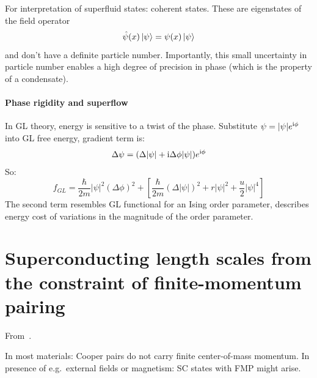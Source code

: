 \documentclass[../notes.tex]{subfiles}
\begin{document}
For interpretation of superfluid states: coherent states.
These are eigenstates of the field operator
\begin{equation}
	\hat{\psi}(x) \ket{\psi} = \psi (x) \ket{\psi} 
\end{equation}
and don't have a definite particle number.
Importantly, this small uncertainty in particle number enables a high degree of precision in phase (which is the property of a condensate).


\paragraph{Phase rigidity and superflow}

In GL theory, energy is sensitive to a twist of the phase.
Substitute \(\psi = \vert \psi \vert e^{\mathrm{i} \phi}\) into GL free energy, gradient term is:
\begin{equation}
	\Delta \psi = (\Delta \vert \psi \vert + \mathrm{i} \Delta \phi \vert \psi \vert) e^{\mathrm{i} \phi}
\end{equation}
So:
\begin{equation}
	f_{GL}  = \frac{\hbar}{2m} \vert \psi \vert^2 (\Delta \phi)^2 + \left[ \frac{\hbar}{2m} (\Delta \vert \psi \vert)^2 + r \vert \psi \vert^2 + \frac{u}{2} \vert \psi \vert^4 \right]
\end{equation}
The second term resembles GL functional for an Ising order parameter, describes energy cost of variations in the magnitude of the order parameter.



\section{Superconducting length scales from the constraint of finite-momentum pairing}

From~\cite{wittBypassingLatticeBCSBEC2024}.

In most materials: Cooper pairs do not carry finite center-of-mass momentum.
In presence of e.g.\ external fields or magnetism: SC states with FMP might arise.
\end{document}

